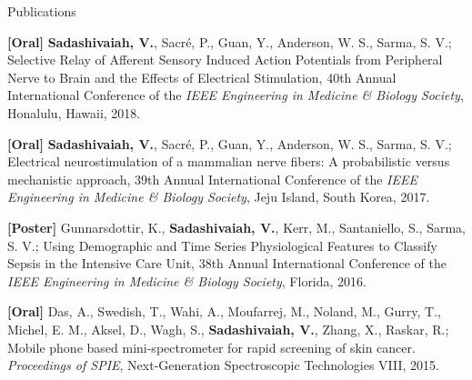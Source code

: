 \documentclass{resume}
\begin{document}
\begin{rSection}{Publications}
\begin{conferences}
\item \textbf{[Oral]} \textbf{Sadashivaiah, V.}, Sacré, P., Guan, Y., Anderson, W. S., Sarma, S. V.; Selective Relay of Afferent Sensory Induced Action Potentials from Peripheral Nerve to Brain and the Effects of Electrical Stimulation, 40th Annual International Conference of the \textit{IEEE Engineering in Medicine \& Biology Society}, Honalulu, Hawaii, 2018.

\item \textbf{[Oral]} \textbf{Sadashivaiah, V.}, Sacré, P., Guan, Y., Anderson, W. S., Sarma, S. V.; Electrical neurostimulation of a mammalian nerve fibers: A probabilistic versus mechanistic approach, 39th Annual International Conference of the \textit{IEEE Engineering in Medicine \& Biology Society}, Jeju Island, South Korea, 2017.

\item \textbf{[Poster]} Gunnarsdottir, K., \textbf{Sadashivaiah, V.}, Kerr, M., Santaniello, S., Sarma, S. V.; Using Demographic and Time Series Physiological Features to Classify Sepsis in the Intensive Care Unit, 38th Annual International Conference of the \textit{IEEE Engineering in Medicine \& Biology Society}, Florida, 2016.

\item \textbf{[Oral]} Das, A., Swedish, T., Wahi, A., Moufarrej, M., Noland, M., Gurry, T., Michel, E. M., Aksel, D., Wagh, S., \textbf{Sadashivaiah, V.}, Zhang, X., Raskar, R.; Mobile phone based mini-spectrometer for rapid screening of skin cancer. \textit{Proceedings of SPIE}, Next-Generation Spectroscopic Technologies VIII, 2015.

\end{conferences}
\end{rSection} 
\end{document}
